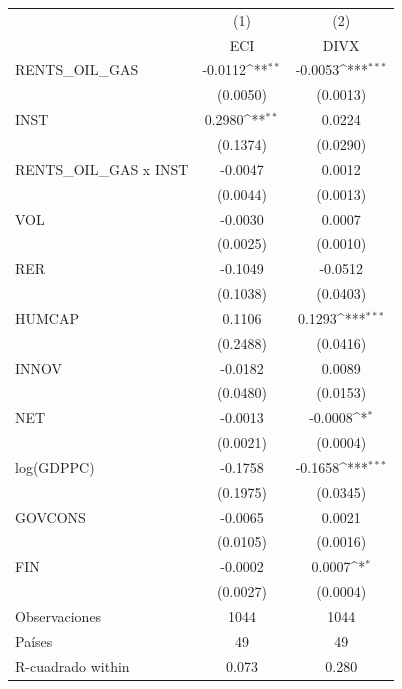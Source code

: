 {
\def\sym#1{\ifmmode^{#1}\else\(^{#1}\)\fi}
\begin{tabular}{l*{2}{c}}
\toprule
                    &\multicolumn{1}{c}{(1)}&\multicolumn{1}{c}{(2)}\\
                    &\multicolumn{1}{c}{ECI}&\multicolumn{1}{c}{DIVX}\\
\midrule
RENTS\_OIL\_GAS       &     -0.0112\sym{**} &     -0.0053\sym{***}\\
                    &    (0.0050)         &    (0.0013)         \\
\addlinespace
INST                &      0.2980\sym{**} &      0.0224         \\
                    &    (0.1374)         &    (0.0290)         \\
\addlinespace
RENTS\_OIL\_GAS x INST&     -0.0047         &      0.0012         \\
                    &    (0.0044)         &    (0.0013)         \\
\addlinespace
VOL                 &     -0.0030         &      0.0007         \\
                    &    (0.0025)         &    (0.0010)         \\
\addlinespace
RER                 &     -0.1049         &     -0.0512         \\
                    &    (0.1038)         &    (0.0403)         \\
\addlinespace
HUMCAP              &      0.1106         &      0.1293\sym{***}\\
                    &    (0.2488)         &    (0.0416)         \\
\addlinespace
INNOV               &     -0.0182         &      0.0089         \\
                    &    (0.0480)         &    (0.0153)         \\
\addlinespace
NET                 &     -0.0013         &     -0.0008\sym{*}  \\
                    &    (0.0021)         &    (0.0004)         \\
\addlinespace
log(GDPPC)          &     -0.1758         &     -0.1658\sym{***}\\
                    &    (0.1975)         &    (0.0345)         \\
\addlinespace
GOVCONS             &     -0.0065         &      0.0021         \\
                    &    (0.0105)         &    (0.0016)         \\
\addlinespace
FIN                 &     -0.0002         &      0.0007\sym{*}  \\
                    &    (0.0027)         &    (0.0004)         \\
\midrule
Observaciones       &        1044         &        1044         \\
Países              &          49         &          49         \\
R-cuadrado within   &       0.073         &       0.280         \\
\bottomrule
\end{tabular}
}
